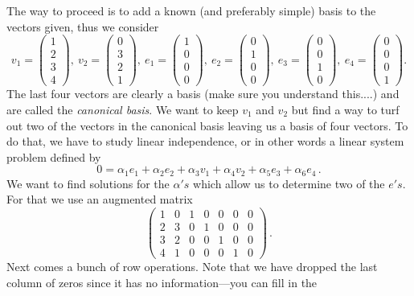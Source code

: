 {The way to proceed is to add a known (and preferably simple) basis to the vectors given, thus we consider
\[
v_1=\begin{pmatrix}1\\2\\3\\4\end{pmatrix},\
v_2=\begin{pmatrix}0\\3\\2\\1\end{pmatrix},\
e_1=\begin{pmatrix}1\\0\\0\\0\end{pmatrix},\
e_2=\begin{pmatrix}0\\1\\0\\0\end{pmatrix},\
e_3=\begin{pmatrix}0\\0\\1\\0\end{pmatrix},\
e_4=\begin{pmatrix}0\\0\\0\\1\end{pmatrix}.
\]
The last four vectors are clearly a basis (make sure you understand this....) and are called the {\itshape canonical basis}.
We want to keep $v_1$ and $v_2$ but find a way to turf out two of the vectors in the canonical basis leaving us
a basis of four vectors. To do that, we have to study linear independence, or in other words a linear system problem
defined by
\[
0=\alpha_1 e_1 + \alpha_2 e_2 + \alpha_3 v_1 + \alpha_4 v_2 + \alpha_5 e_3 + \alpha_6 e_4 \, .
\]
We want to find solutions for the $\alpha's$ which allow us to determine two of the $e's$.
For that we use an augmented matrix
\[
\left(\begin{array}{cccccc|c}
1&0&1&0&0&0&0\\
2&3&0&1&0&0&0\\
3&2&0&0&1&0&0\\
4&1&0&0&0&1&0
\end{array}\right)\, .
\]
Next comes a bunch of row operations. Note that we have dropped the last column of zeros since it has no information---you can fill in the 
}
